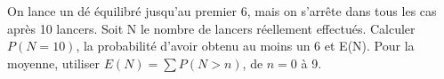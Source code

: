 \documentclass[11pt]{article}
\begin{document}
On lance un dé équilibré jusqu’au premier 6, mais on s’arrête dans tous les cas après 10 lancers. Soit N le nombre de lancers réellement effectués. Calculer \(P(N=10)\), la probabilité d’avoir obtenu au moins un 6 et E(N). Pour la moyenne, utiliser \(E(N)=\sum  P(N>n)\), de \(n=0\) à 9.\par
\vspace{5pt}
\end{document}
